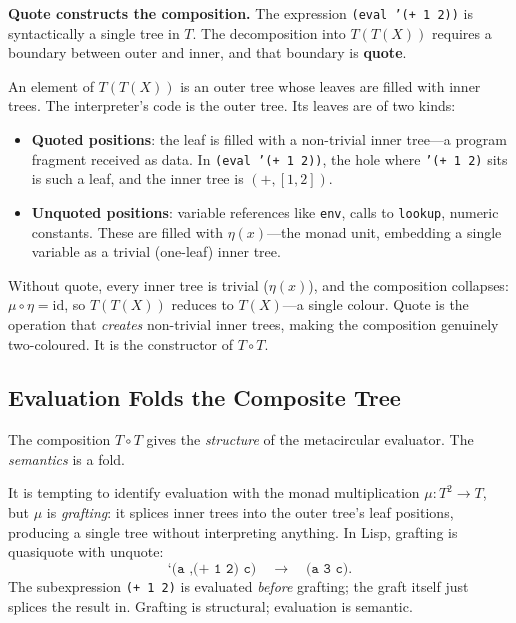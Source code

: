 \documentclass[11pt,a4paper]{article}
\theoremstyle{definition}
\theoremstyle{plain}
\begin{document}
\medskip
\noindent\textbf{Quote constructs the composition.}\quad
The expression \texttt{(eval '(+ 1 2))} is syntactically a single tree
in $T$. The decomposition into $T(T(X))$ requires a boundary between
outer and inner, and that boundary is \textbf{quote}.

An element of $T(T(X))$ is an outer tree whose leaves are filled with
inner trees. The interpreter's code is the outer tree. Its leaves are
of two kinds:
\begin{itemize}[nosep]
\item \textbf{Quoted positions}: the leaf is filled with a non-trivial
  inner tree---a program fragment received as data. In
  \texttt{(eval '(+ 1 2))}, the hole where \texttt{'(+ 1 2)} sits is
  such a leaf, and the inner tree is $(\mathord{+}, [1, 2])$.
\item \textbf{Unquoted positions}: variable references like
  \texttt{env}, calls to \texttt{lookup}, numeric constants. These are
  filled with $\eta(x)$---the monad unit, embedding a single variable
  as a trivial (one-leaf) inner tree.
\end{itemize}
Without quote, every inner tree is trivial ($\eta(x)$), and the
composition collapses: $\mu \circ \eta = \mathrm{id}$, so $T(T(X))$
reduces to $T(X)$---a single colour. Quote is the operation that
\emph{creates} non-trivial inner trees, making the composition
genuinely two-coloured. It is the constructor of $T \circ T$.

\subsection{Evaluation Folds the Composite Tree}

The composition $T \circ T$ gives the \emph{structure} of the
metacircular evaluator. The \emph{semantics} is a fold.

It is tempting to identify evaluation with the monad multiplication
$\mu : T^2 \to T$, but $\mu$ is \emph{grafting}: it splices inner
trees into the outer tree's leaf positions, producing a single tree
without interpreting anything. In Lisp, grafting is quasiquote
with unquote:
\[
\texttt{`(a ,(+ 1 2) c)}
\quad\longrightarrow\quad
\texttt{(a 3 c)}.
\]
The subexpression \texttt{(+ 1 2)} is evaluated \emph{before}
grafting; the graft itself just splices the result in. Grafting is
structural; evaluation is semantic.
\end{document}
